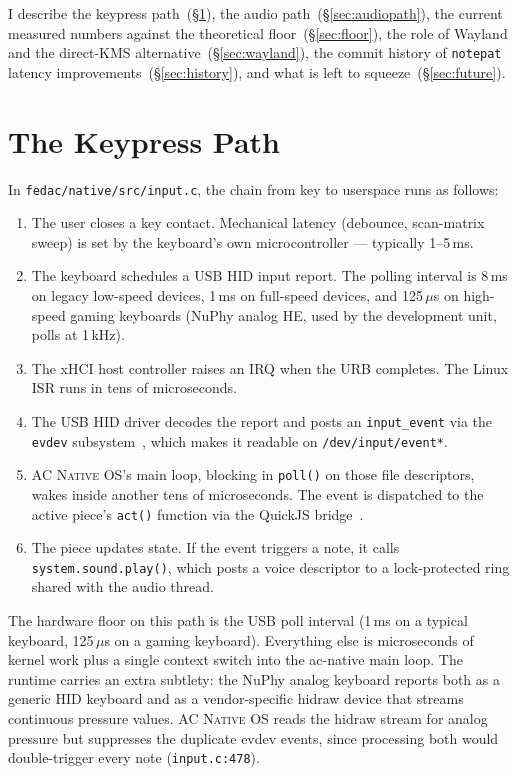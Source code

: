 \documentclass[10pt,letterpaper,twocolumn]{article}
\newcommand{\acos}{\textsc{AC Native OS}}
\begin{document}
I describe the keypress path~(\S\ref{sec:keypath}), the audio path~(\S\ref{sec:audiopath}), the current measured numbers against the theoretical floor~(\S\ref{sec:floor}), the role of Wayland and the direct-KMS alternative~(\S\ref{sec:wayland}), the commit history of \texttt{notepat} latency improvements~(\S\ref{sec:history}), and what is left to squeeze~(\S\ref{sec:future}).


\section{The Keypress Path}
\label{sec:keypath}

In \texttt{fedac/native/src/input.c}, the chain from key to userspace runs as follows:

\begin{enumerate}
  \item The user closes a key contact. Mechanical latency (debounce, scan-matrix sweep) is set by the keyboard's own microcontroller --- typically 1--5\,ms.
  \item The keyboard schedules a USB HID input report. The polling interval is 8\,ms on legacy low-speed devices, 1\,ms on full-speed devices, and 125\,$\mu$s on high-speed gaming keyboards (NuPhy analog HE, used by the development unit, polls at 1\,kHz).
  \item The xHCI host controller raises an IRQ when the URB completes. The Linux ISR runs in tens of microseconds.
  \item The USB HID driver decodes the report and posts an \texttt{input\_event} via the \texttt{evdev} subsystem~\citep{evdev}, which makes it readable on \texttt{/dev/input/event*}.
  \item \acos{}'s main loop, blocking in \texttt{poll()} on those file descriptors, wakes inside another tens of microseconds. The event is dispatched to the active piece's \texttt{act()} function via the QuickJS bridge~\citep{quickjs}.
  \item The piece updates state. If the event triggers a note, it calls \texttt{system.sound.play()}, which posts a voice descriptor to a lock-protected ring shared with the audio thread.
\end{enumerate}

The hardware floor on this path is the USB poll interval (1\,ms on a typical keyboard, 125\,$\mu$s on a gaming keyboard). Everything else is microseconds of kernel work plus a single context switch into the ac-native main loop. The runtime carries an extra subtlety: the NuPhy analog keyboard reports both as a generic HID keyboard and as a vendor-specific hidraw device that streams continuous pressure values. \acos{} reads the hidraw stream for analog pressure but suppresses the duplicate evdev events, since processing both would double-trigger every note (\texttt{input.c:478}).
\end{document}

